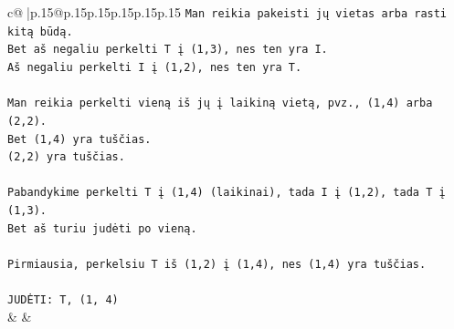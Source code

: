 \documentclass{article}
\begin{document}
{\begin{supertabular}{c@{$\;$}|p{.15\linewidth}@{}p{.15\linewidth}p{.15\linewidth}p{.15\linewidth}p{.15\linewidth}p{.15\linewidth}}
{{{\texttt{Man reikia pakeisti jų vietas arba rasti kitą būdą.} \\
\texttt{Bet aš negaliu perkelti T į (1,3), nes ten yra I.} \\
\texttt{Aš negaliu perkelti I į (1,2), nes ten yra T.} \\
\\ 
\texttt{Man reikia perkelti vieną iš jų į laikiną vietą, pvz., (1,4) arba (2,2).} \\
\texttt{Bet (1,4) yra tuščias.} \\
\texttt{(2,2) yra tuščias.} \\
\\ 
\texttt{Pabandykime perkelti T į (1,4) (laikinai), tada I į (1,2), tada T į (1,3).} \\
\texttt{Bet aš turiu judėti po vieną.} \\
\\ 
\texttt{Pirmiausia, perkelsiu T iš (1,2) į (1,4), nes (1,4) yra tuščias.} \\
\\ 
\texttt{JUDĖTI: T, (1, 4)} \\
            }
        }
    }
    & & \\ \\


\end{supertabular}}
\end{document}
